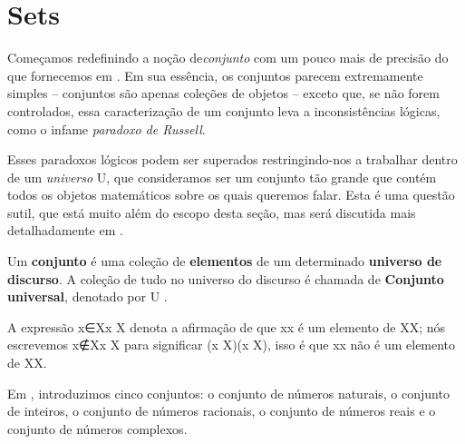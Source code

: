 \section{Sets}

Começamos redefinindo a noção de\textit{conjunto} com um pouco mais de precisão do que fornecemos em . Em sua essência, os conjuntos parecem extremamente simples – conjuntos são apenas coleções de objetos – exceto que, se não forem controlados, essa caracterização de um conjunto leva a inconsistências lógicas, como o infame \textit{paradoxo de Russell}.

Esses paradoxos lógicos podem ser superados restringindo-nos a trabalhar dentro de um \textit{universo} U, que consideramos ser um conjunto tão grande que contém todos os objetos matemáticos sobre os quais queremos falar. Esta é uma questão sutil, que está muito além do escopo desta seção, mas será discutida mais detalhadamente em .

\begin{definition}
\label{defSet}
Um \textbf{conjunto} é uma coleção de \textbf{elementos} de um determinado \textbf{universo de discurso}. A coleção de tudo no universo do discurso é chamada de \textbf{Conjunto universal}, denotado por U .

A expressão x∈Xx \in X  denota a afirmação de que xx é um elemento de XX; nós escrevemos x∉Xx \not \in X  para significar \neg (x \in X)\neg (x \in X), isso é que xx não é um elemento de XX.
\end{definition}

\begin{example}
Em , introduzimos cinco conjuntos: o conjunto  de números naturais, o conjunto  de inteiros, o conjunto  de números racionais, o conjunto  de números reais e o conjunto  de números complexos.
\end{example}

